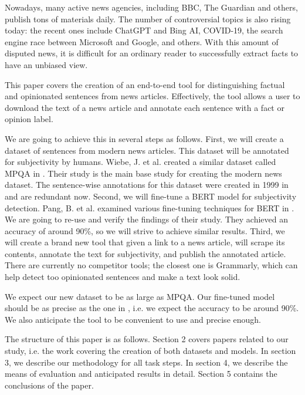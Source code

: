 \documentclass[conference]{IEEEtran}
\begin{document}
Nowadays, many active news agencies, including BBC, The Guardian and others, publish tons of materials daily. The number of controversial topics is also rising today: the recent ones include ChatGPT and Bing AI, COVID-19, the search engine race between Microsoft and Google, and others. With this amount of disputed news, it is difficult for an ordinary reader to successfully extract facts to have an unbiased view. 

This paper covers the creation of an end-to-end tool for distinguishing factual and opinionated sentences from news articles. Effectively, the tool allows a user to download the text of a news article and annotate each sentence with a fact or opinion label.

We are going to achieve this in several steps as follows. First, we will create a dataset of sentences from modern news articles. This dataset will be annotated for subjectivity by humans. Wiebe, J. et al. created a similar dataset called MPQA in \cite{mpqa}. Their study is the main base study for creating the modern news dataset. The sentence-wise annotations for this dataset were created in 1999 in \cite{mpqa-opinion} and are redundant now. Second, we will fine-tune a BERT model for subjectivity detection. Pang, B. et al. examined various fine-tuning techniques for BERT in \cite{bert-finetune}. We are going to re-use and verify the findings of their study. They achieved an accuracy of around 90\%, so we will strive to achieve similar results. Third, we will create a brand new tool that given a link to a news article, will scrape its contents, annotate the text for subjectivity, and publish the annotated article. There are currently no competitor tools; the closest one is Grammarly, which can help detect too opinionated sentences and make a text look solid.

We expect our new dataset to be as large as MPQA. Our fine-tuned model should be as precise as the one in \cite{bert-finetune}, i.e. we expect the accuracy to be around 90\%. We also anticipate the tool to be convenient to use and precise enough.

The structure of this paper is as follows. Section 2 covers papers related to our study, i.e. the work covering the creation of both datasets and models. In section 3, we describe our methodology for all task steps. In section 4, we describe the means of evaluation and anticipated results in detail. Section 5 contains the conclusions of the paper.
\end{document}
